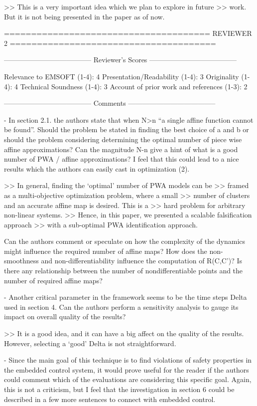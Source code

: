 >> This is a very important idea which we plan to explore in future
>> work. But it is not being presented in the paper as of now.

======================================
                            REVIEWER 2
======================================


--------------------------------------
Reviewer's Scores
--------------------------------------

               Relevance to EMSOFT (1-4): 4
          Presentation/Readability (1-4): 3
                       Originality (1-4): 4
               Technical Soundness (1-4): 3
Account of prior work and references (1-3): 2


--------------------------------------
Comments
--------------------------------------

- In section 2.1. the authors state that when N>n “a single affine function
cannot be found”. Should the problem be stated in finding the best choice of
a and b or should the problem considering determining the optimal number of
piece wise affine approximations? Can the magnitude N-n give a hint of what is
a good number of PWA / affine approximations? I feel that this could lead to a
nice results which the authors can easily cast in optimization (2).

>> In general, finding the `optimal' number of PWA models can be
>> framed as a multi-objective optimization problem, where a small
>> number of clusters and an accurate affine map is desired. This is a
>> hard problem for arbitrary non-linear systems.
>> Hence, in this paper, we presented a scalable falsification approach
>> with a sub-optimal PWA identification approach.


Can the authors comment or speculate on how the complexity of the
dynamics might influence the required number of affine maps? How does
the non-smoothness and non-differentiability influence the computation
of R(C,C’)? Is there any relationship between the number of
nondifferentiable points and the number of required affine maps?


- Another critical parameter in the framework seems to be the time steps Delta
used in section 4. Can the authors perform a sensitivity analysis to gauge its
impact on overall quality of the results?

>> It is a good idea, and it can have a big affect on the quality of
the results. However, selecting a `good' Delta is not straightforward.

- Since the main goal of this technique is to find violations of safety
properties in the embedded control system, it would prove useful for the reader
if the authors could comment which of the evaluations are considering this
specific goal. Again, this is not a criticism, but I feel that the
investigation in section 6 could be described in a few more sentences to
connect with embedded control.

